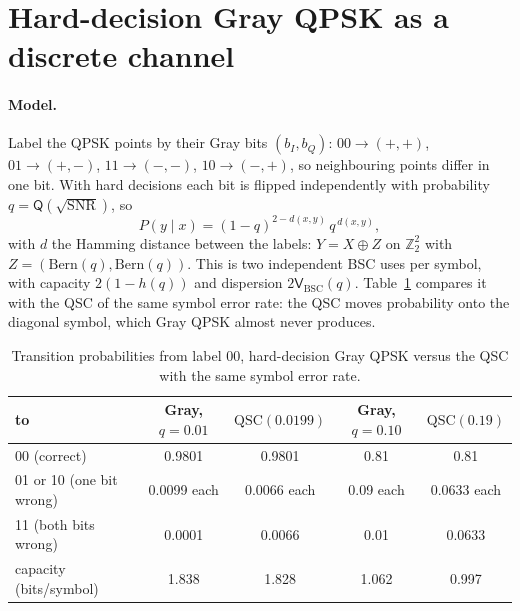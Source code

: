 \documentclass[11pt]{article}
\newcommand{\Vsf}{\mathsf{V}}
\newcommand{\BSC}{\mathrm{BSC}}
\newcommand{\QSC}{\mathrm{QSC}}
\begin{document}
\begin{table}[t]
\centering
\caption{QSBC: largest $R_1$ advantage (bits/symbol) of SUP over TDM. ``RS'' is the further asymptotic gain found by random search. Finite-$n$ values are normal approximations over interior rate pairs; only their sign and the crossover are robust.}
\label{tab:qsbc}
\end{table}

\section{Hard-decision Gray QPSK as a discrete channel}\label{sec:grayqpsk}
\paragraph{Model.} Label the QPSK points by their Gray bits $(b_I,b_Q)$: $00\to(+,+)$, $01\to(+,-)$, $11\to(-,-)$, $10\to(-,+)$, so neighbouring points differ in one bit. With hard decisions each bit is flipped independently with probability $q=\mathsf Q(\sqrt{\mathrm{SNR}})$, so
\[
P(y\mid x)=(1-q)^{2-d(x,y)}\,q^{\,d(x,y)},
\]
with $d$ the Hamming distance between the labels: $Y=X\oplus Z$ on $\mathbb Z_2^2$ with $Z=(\mathrm{Bern}(q),\mathrm{Bern}(q))$. This is two independent BSC uses per symbol, with capacity $2(1-h(q))$ and dispersion $2\Vsf_{\BSC}(q)$. Table~\ref{tab:graymat} compares it with the QSC of the same symbol error rate: the QSC moves probability onto the diagonal symbol, which Gray QPSK almost never produces.

\begin{table}[t]
\centering
\caption{Transition probabilities from label 00, hard-decision Gray QPSK versus the QSC with the same symbol error rate.}
\label{tab:graymat}
\begin{tabular}{@{}lcccc@{}}
\toprule
to & Gray, $q=0.01$ & $\QSC(0.0199)$ & Gray, $q=0.10$ & $\QSC(0.19)$\\
\midrule
00 (correct) & 0.9801 & 0.9801 & 0.81 & 0.81\\
01 or 10 (one bit wrong) & 0.0099 each & 0.0066 each & 0.09 each & 0.0633 each\\
11 (both bits wrong) & 0.0001 & 0.0066 & 0.01 & 0.0633\\
capacity (bits/symbol) & 1.838 & 1.828 & 1.062 & 0.997\\
\bottomrule
\end{tabular}
\end{table}
\end{document}
